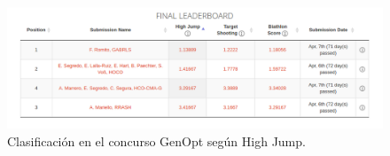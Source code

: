 \begin{figure}[!ht]
  \centering
	\includegraphics[scale=0.5]{images/final}
  \caption{Clasificación en el concurso GenOpt según High Jump.}
\end{figure}

